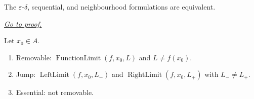 
\begin{lemma}
\label{lem:equivalent-discontinuity-at-a-point}
The $\varepsilon$-$\delta$, sequential, and neighbourhood formulations are equivalent.

\smallskip
\noindent
\hyperref[prf:discontinuity-equivalence]{\textit{Go to proof.}}
\end{lemma}


\begin{tcolorbox}[title={Definition --- Types of Discontinuity}]
\begin{definition}
\label{def:types-of-discontinuity-at-a-point}
Let $x_0 \in A$.
\begin{enumerate}[label=(\roman*)]
  \item Removable: $\operatorname{FunctionLimit}(f,x_0,L)$ and $L \neq f(x_0)$.
  \item Jump: $\operatorname{LeftLimit}(f,x_0,L_-)$ and $\operatorname{RightLimit}(f,x_0,L_+)$ with $L_- \neq L_+$.
  \item Essential: not removable.
\end{enumerate}
\end{definition}
\end{tcolorbox}